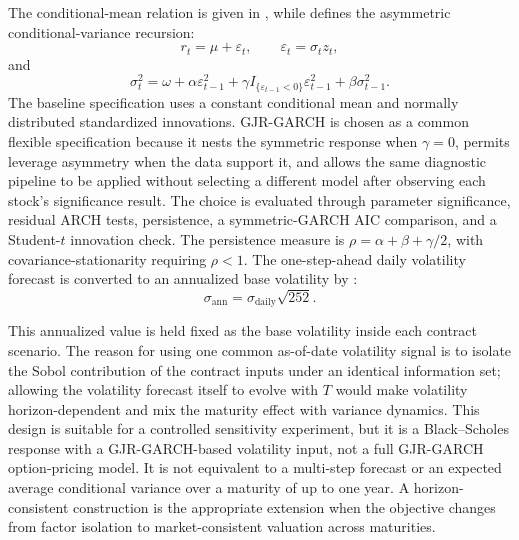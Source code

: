 The conditional-mean relation is given in , while  defines the asymmetric conditional-variance recursion:
\begin{equation}
  r_t = \mu + \varepsilon_t,\qquad \varepsilon_t=\sigma_t z_t,
  \label{eq:return-equation}
\end{equation}
and
\begin{equation}
  \sigma_t^2 = \omega + \alpha\varepsilon_{t-1}^{2}
  +\gamma I_{\{\varepsilon_{t-1}<0\}}\varepsilon_{t-1}^{2}
  +\beta\sigma_{t-1}^{2}.
  \label{eq:gjr-garch}
\end{equation}
The baseline specification uses a constant conditional mean and normally distributed standardized innovations. GJR-GARCH is chosen as a common flexible specification because it nests the symmetric response when $\gamma=0$, permits leverage asymmetry when the data support it, and allows the same diagnostic pipeline to be applied without selecting a different model after observing each stock's significance result. The choice is evaluated through parameter significance, residual ARCH tests, persistence, a symmetric-GARCH AIC comparison, and a Student-$t$ innovation check. The persistence measure is $\rho=\alpha+\beta+\gamma/2$, with covariance-stationarity requiring $\rho<1$. The one-step-ahead daily volatility forecast is converted to an annualized base volatility by :
\begin{equation}
  \sigma_{\mathrm{ann}}=\sigma_{\mathrm{daily}}\sqrt{252}.
  \label{eq:annualized-volatility}
\end{equation}

This annualized value is held fixed as the base volatility inside each contract scenario. The reason for using one common as-of-date volatility signal is to isolate the Sobol contribution of the contract inputs under an identical information set; allowing the volatility forecast itself to evolve with $T$ would make volatility horizon-dependent and mix the maturity effect with variance dynamics. This design is suitable for a controlled sensitivity experiment, but it is a Black--Scholes response with a GJR-GARCH-based volatility input, not a full GJR-GARCH option-pricing model. It is not equivalent to a multi-step forecast or an expected average conditional variance over a maturity of up to one year. A horizon-consistent construction is the appropriate extension when the objective changes from factor isolation to market-consistent valuation across maturities.

